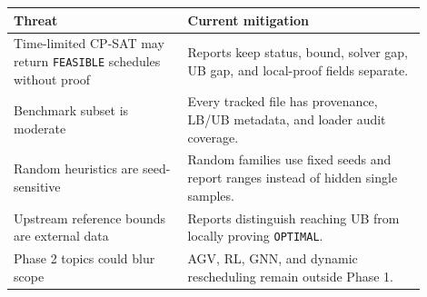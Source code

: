 ﻿\documentclass[11pt]{article}
\begin{document}
\begin{table}[h]
\centering
\begin{tabular}{p{0.38\linewidth}p{0.52\linewidth}}
\toprule
Threat & Current mitigation \\
\midrule
Time-limited CP-SAT may return \texttt{FEASIBLE} schedules without proof &
Reports keep status, bound, solver gap, UB gap, and local-proof fields separate. \\
Benchmark subset is moderate &
Every tracked file has provenance, LB/UB metadata, and loader audit coverage. \\
Random heuristics are seed-sensitive &
Random families use fixed seeds and report ranges instead of hidden single samples. \\
Upstream reference bounds are external data &
Reports distinguish reaching UB from locally proving \texttt{OPTIMAL}. \\
Phase 2 topics could blur scope &
AGV, RL, GNN, and dynamic rescheduling remain outside Phase 1. \\
\bottomrule
\end{tabular}
\end{table}
\end{document}
